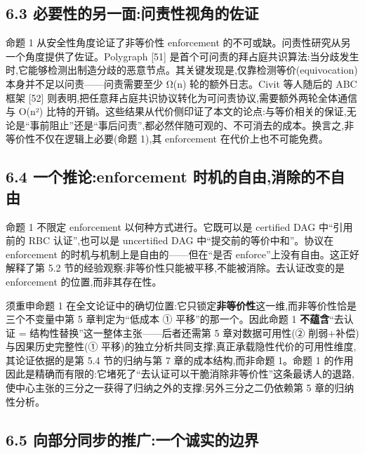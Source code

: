 \documentclass[UTF8,fontset=windows,a4paper,11pt]{ctexart}
\begin{document}
\subsection{6.3
必要性的另一面:问责性视角的佐证}\label{ux5fc5ux8981ux6027ux7684ux53e6ux4e00ux9762ux95eeux8d23ux6027ux89c6ux89d2ux7684ux4f50ux8bc1}

命题 1 从安全性角度论证了非等价性 enforcement
的不可或缺。问责性研究从另一个角度提供了佐证。Polygraph {[}51{]}
是首个可问责的拜占庭共识算法:当分歧发生时,它能够检测出制造分歧的恶意节点。其关键发现是,仅靠检测等价(equivocation)本身并不足以问责------问责需要至少
Ω(n) 轮的额外日志。Civit 等人随后的 ABC 框架 {[}52{]}
则表明,把任意拜占庭共识协议转化为可问责协议,需要额外两轮全体通信与 O(n²)
比特的开销。这些结果从代价侧印证了本文的论点:与等价相关的保证,无论是``事前阻止''还是``事后问责'',都必然伴随可观的、不可消去的成本。换言之,非等价性不仅在逻辑上必要(命题
1),其 enforcement 在代价上也不可能免费。

\subsection{6.4 一个推论:enforcement
时机的自由,消除的不自由}\label{ux4e00ux4e2aux63a8ux8bbaenforcement-ux65f6ux673aux7684ux81eaux7531ux6d88ux9664ux7684ux4e0dux81eaux7531}

命题 1 不限定 enforcement 以何种方式进行。它既可以是 certified DAG
中``引用前的 RBC 认证'',也可以是 uncertified DAG
中``提交前的等价中和''。协议在 enforcement
的时机与机制上是自由的------但在``是否
enforce''上没有自由。这正好解释了第 5.2
节的经验观察:非等价性只能被平移,不能被消除。去认证改变的是 enforcement
的位置,而非其存在性。

须重申命题 1
在全文论证中的确切位置:它只锁定\textbf{非等价性}这一维,而非等价性恰是三个不变量中第
5 章判定为``低成本 ① 平移''的那一个。因此命题 1 \textbf{不蕴含}``去认证
= 结构性替换''这一整体主张------后者还需第 5 章对数据可用性(②
削弱+补偿)与因果历史完整性(①
平移)的独立分析共同支撑;真正承载隐性代价的可用性维度,其论证依据的是第
5.4 节的归纳与第 7 章的成本结构,而非命题 1。命题 1
的作用因此是精确而有限的:它堵死了``去认证可以干脆消除非等价性''这条最诱人的退路,使中心主张的三分之一获得了归纳之外的支撑;另外三分之二仍依赖第
5 章的归纳性分析。

\subsection{6.5
向部分同步的推广:一个诚实的边界}\label{ux5411ux90e8ux5206ux540cux6b65ux7684ux63a8ux5e7fux4e00ux4e2aux8bdaux5b9eux7684ux8fb9ux754c}
\end{document}
